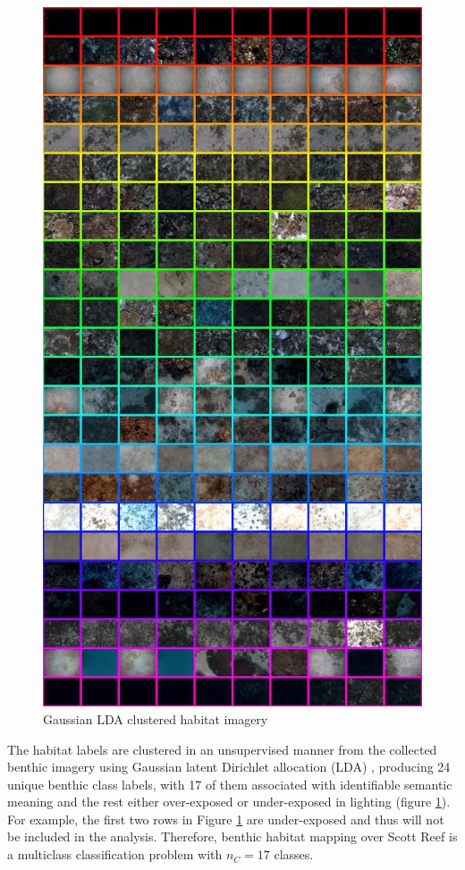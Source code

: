 		\begin{figure}
			\centering
				\includegraphics[width=\linewidth]{Figures/label_images.png}
			\caption{Gaussian LDA clustered habitat imagery \citep{Steinberg2015128}}
			\label{Figure:LabelImages}
		\end{figure}
		
		The habitat labels are clustered in an unsupervised manner from the collected benthic imagery using Gaussian latent Dirichlet allocation (LDA) \citep{Steinberg2015128}, producing 24 unique benthic class labels, with 17 of them associated with identifiable semantic meaning and the rest either over-exposed or under-exposed in lighting (figure \ref{Figure:LabelImages}). For example, the first two rows in Figure \ref{Figure:LabelImages} are under-exposed and thus will not be included in the analysis. Therefore, benthic habitat mapping over Scott Reef is a multiclass classification problem with $n_{C} = 17$ classes.
			
